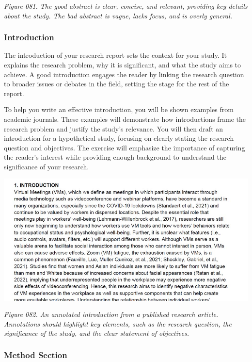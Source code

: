 \documentclass[
]{book}
\begin{document}
\emph{Figure 081. The good abstract is clear, concise, and relevant, providing key details about the study. The bad abstract is vague, lacks focus, and is overly general.}

\subsubsection{Introduction}\label{introduction}

The introduction of your research report sets the context for your study. It explains the research problem, why it is significant, and what the study aims to achieve. A good introduction engages the reader by linking the research question to broader issues or debates in the field, setting the stage for the rest of the report.

To help you write an effective introduction, you will be shown examples from academic journals. These examples will demonstrate how introductions frame the research problem and justify the study's relevance. You will then draft an introduction for a hypothetical study, focusing on clearly stating the research question and objectives. The exercise will emphasize the importance of capturing the reader's interest while providing enough background to understand the significance of your research.

\includegraphics[width=1\textwidth,height=\textheight]{images/fig082.jpg}

\emph{Figure 082. An annotated introduction from a published research article. Annotations should highlight key elements, such as the research question, the significance of the study, and the clear statement of objectives.}

\subsubsection{Method Section}\label{method-section}
\end{document}

